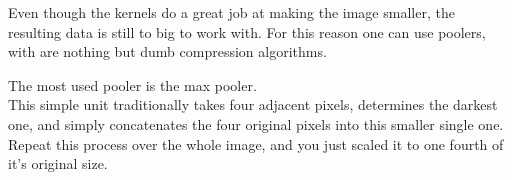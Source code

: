 Even though the kernels do a great job at making the image smaller, the resulting data is still to big to work with.  
For this reason one can use poolers, with are nothing but dumb compression algorithms. 
 
The most used pooler is the max pooler. \cite{Graham2014}  \\
This simple unit traditionally takes four adjacent pixels, determines the darkest one, and simply concatenates the four original pixels into this smaller single one.  
Repeat this process over the whole image, and you just scaled it to one fourth of it's original size.